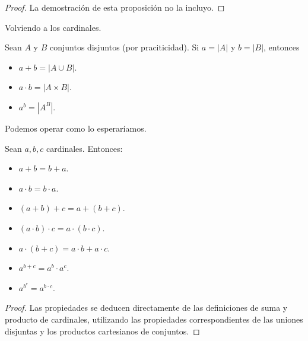 \begin{proof}
	{\color{red} La demostración de esta proposición no la incluyo.}
\end{proof}

Volviendo a los cardinales.

\begin{definition}
	Sean $A$ y $B$ conjuntos disjuntos (por praciticidad). Si $a = \lvert A \rvert$ y $b = \lvert B \rvert$, entonces
	\begin{itemize}
		\item $a + b = |A \cup B|$.
		\item $a \cdot b = |A \times B|$.
		\item $a^{b} = |A^{B}|$.
	\end{itemize}
\end{definition}

Podemos operar como lo esperaríamos.

\begin{proposition}
	Sean $a, b, c$ cardinales. Entonces:
	\begin{itemize}
		\item $a + b = b + a$.
		\item $a \cdot b = b \cdot a$.
		\item $(a + b) + c = a + (b + c)$.
		\item $(a \cdot b) \cdot c = a \cdot (b \cdot c)$.
		\item $a \cdot (b + c) = a \cdot b + a \cdot c$.
		\item $a^{b+c} = a^{b} \cdot a^{c}$.
		\item $a^{b^{c}} = a^{b \cdot c}$.
	\end{itemize}
\end{proposition}

\begin{proof}
	Las propiedades se deducen directamente de las definiciones de suma y producto de cardinales, utilizando las propiedades correspondientes de las uniones disjuntas y los productos cartesianos de conjuntos.
\end{proof}
